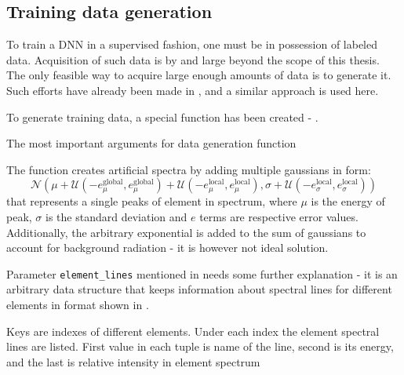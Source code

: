 \subsection{Training data generation}
To train a DNN in a supervised fashion, one must be in possession of labeled data. 
Acquisition of such data is by and large beyond the scope of this thesis. 
The only feasible way to acquire large enough amounts of data is to generate it. 
Such efforts have already been made in \cite{Jones2022}, and a similar approach is used here.

To generate training data, a special function has been created - . 

\newenvironment{longlistingD}{\captionsetup{type=listing, width=0.8\textwidth}}{}
\begin{longlistingD}
    \caption{The most important arguments for data generation function}
    \label{lst:data_generation}
\end{longlistingD}
\vspace{12pt}

The function creates artificial spectra by adding multiple gaussians in form: \[\mathcal{N}(\mu + \mathcal{U}(-e_\mu^{\text{global}}, e_\mu^{\text{global}}) + \mathcal{U}(-e_\mu^{\text{local}}, e_\mu^{\text{local}}), \sigma + \mathcal{U}(-e_\sigma^{\text{local}}, e_\sigma^{\text{local}}))\]
that represents a single peaks of element in spectrum, where $\mu$ is the energy of peak, $\sigma$ is the standard deviation and $e$ terms are respective error values. Additionally, the arbitrary exponential is added to the sum of gaussians to account for background radiation - it is however not ideal solution.

Parameter \texttt{element\_lines} mentioned in  needs some further explanation - it is an arbitrary data structure that keeps information about spectral lines for different elements in format shown in .

\newenvironment{longlistingE}{\captionsetup{type=listing, width=0.8\textwidth}}{}
\begin{longlistingE}
    \caption{Keys are indexes of different elements. Under each index the element spectral lines are listed. First value in each tuple is name of the line, second is its energy, and the last is relative intensity in element spectrum}
    \label{lst:element_lines}
\end{longlistingE}
\vspace{12pt}

